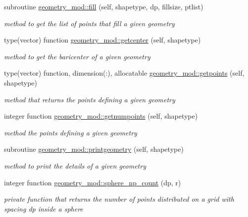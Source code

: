 \begin{DoxyCompactItemize}
subroutine \mbox{\hyperlink{namespacegeometry__mod_a1d97564e04562532b5389bfb91aa676b}{geometry\+\_\+mod\+::fill}} (self, shapetype, dp, fillsize, ptlist)
\begin{DoxyCompactList}\small\item\em method to get the list of points that fill a given geometry \end{DoxyCompactList}\item 
type(vector) function \mbox{\hyperlink{namespacegeometry__mod_a4a38edbff02aa0ff5f16a16c39bf778e}{geometry\+\_\+mod\+::getcenter}} (self, shapetype)
\begin{DoxyCompactList}\small\item\em method to get the baricenter of a given geometry \end{DoxyCompactList}\item 
type(vector) function, dimension(\+:), allocatable \mbox{\hyperlink{namespacegeometry__mod_a0b1a3c5aa414292ace34d59487082e3a}{geometry\+\_\+mod\+::getpoints}} (self, shapetype)
\begin{DoxyCompactList}\small\item\em method that returns the points defining a given geometry \end{DoxyCompactList}\item 
integer function \mbox{\hyperlink{namespacegeometry__mod_a524c5d28a80fb6729b102126485605ce}{geometry\+\_\+mod\+::getnumpoints}} (self, shapetype)
\begin{DoxyCompactList}\small\item\em method the points defining a given geometry \end{DoxyCompactList}\item 
subroutine \mbox{\hyperlink{namespacegeometry__mod_aed4426181ca851b41717edd50268e5f3}{geometry\+\_\+mod\+::printgeometry}} (self, shapetype)
\begin{DoxyCompactList}\small\item\em method to print the details of a given geometry \end{DoxyCompactList}\item 
integer function \mbox{\hyperlink{namespacegeometry__mod_a05de7940b4e7df5a2b31f3d0414e3743}{geometry\+\_\+mod\+::sphere\+\_\+np\+\_\+count}} (dp, r)
\begin{DoxyCompactList}\small\item\em private function that returns the number of points distributed on a grid with spacing dp inside a sphere \end{DoxyCompactList}\item 

\end{DoxyCompactItemize}
